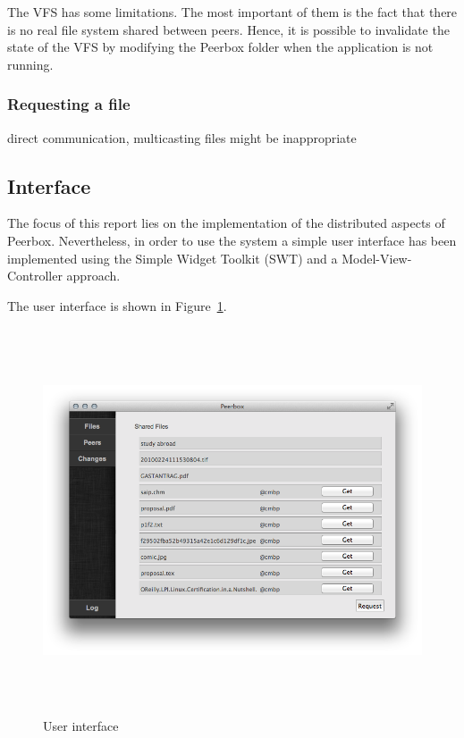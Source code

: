 The VFS has some limitations. The most important of them is the fact that there is no real file system shared between peers. Hence, it is possible to invalidate the state of the VFS by modifying the Peerbox folder when the application is not running.


\subsubsection{Requesting a file}
direct communication, multicasting files might be inappropriate


\subsection{Interface}
The focus of this report lies on the implementation of the distributed aspects of Peerbox. Nevertheless, in order to use the system a simple user interface has been implemented using the Simple Widget Toolkit (SWT) and a Model-View-Controller approach. 

The user interface is shown in Figure~\ref{fig:figures_gui}.
\begin{figure}[htbp]
    \centering
        \includegraphics[height=4.5in]{figures/gui.png}
    \caption{User interface}
    \label{fig:figures_gui}
\end{figure}
